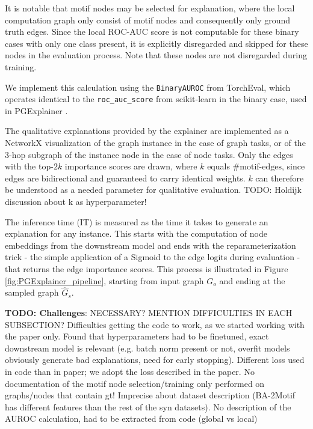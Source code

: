It is notable that motif nodes may be selected for explanation, where the local computation graph only consist of motif nodes and consequently only ground truth edges. Since the local ROC-AUC score is not computable for these binary cases with only one class present, it is explicitly disregarded and skipped for these nodes in the evaluation process. Note that these nodes are not disregarded during training.

We implement this calculation using the \lstinline|BinaryAUROC| from TorchEval, which operates identical to the \lstinline|roc_auc_score| from scikit-learn \cite{pedregosa2011scikit} in the binary case, used in PGExplainer \cite{luo2020parameterized}.

The qualitative explanations provided by the explainer are implemented as a NetworkX visualization of the graph instance in the case of graph tasks, or of the $3$-hop subgraph of the instance node in the case of node tasks. Only the edges with the top-$2k$ importance scores are drawn, where $k$ equals $\text{\#motif-edges}$, since edges are bidirectional and guaranteed to carry identical weights. $k$ can therefore be understood as a needed parameter for qualitative evaluation. TODO: Holdijk discussion about k as hyperparameter! \bigskip

The inference time (IT) is measured as the time it takes to generate an explanation for any instance. This starts with the computation of node embeddings from the downstream model and ends with the reparameterization trick - the simple application of a Sigmoid to the edge logits during evaluation - that returns the edge importance scores. This process is illustrated in Figure \ref{fig:PGExplainer_pipeline}, starting from input graph $G_o$ and ending at the sampled graph $\hat{G}_s$. \bigskip

\textbf{TODO: Challenges}: NECESSARY? MENTION DIFFICULTIES IN EACH SUBSECTION? Difficulties getting the code to work, as we started working with the paper only. Found that hyperparameters had to be finetuned, exact downstream model is relevant (e.g. batch norm present or not, overfit models obviously generate bad explanations, need for early stopping). Different loss used in code than in paper; we adopt the loss described in the paper. No documentation of the motif node selection/training only performed on graphs/nodes that contain gt! Imprecise about dataset description (BA-2Motif has different features than the rest of the syn datasets). No description of the AUROC calculation, had to be extracted from code (global vs local) \bigskip

